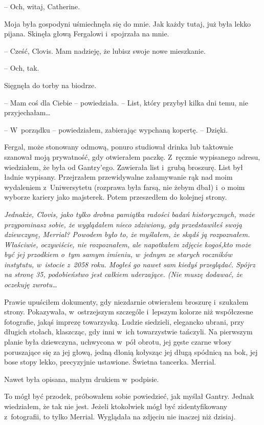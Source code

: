 \documentclass[oneside,polish,11pt,sfheadings]{mwbk}
\begin{document}
-- Och, witaj, Catherine.

Moja była gospodyni uśmiechnęła się do mnie. Jak każdy tutaj, już była
lekko pijana. Skinęła głową Fergalowi i~spojrzała na mnie.

-- Cześć, Clovis. Mam nadzieję, że lubisz swoje nowe mieszkanie.

-- Och, tak.

Sięgnęła do torby na biodrze. 

-- Mam coś dla Ciebie -- powiedziała. -- List, który przybył kilka dni temu, nie przyjechałam\ldots

-- W~porządku -- powiedziałem, zabierając wypchaną kopertę. -- Dzięki.

Fergal, może stonowany odmową, ponuro studiował drinka lub taktownie
szanował moją prywatność, gdy otwierałem paczkę. Z~ręcznie wypisanego
adresu, wiedziałem, że była od Gantry'ego. Zawierała list i~grubą
broszurę. List był ładnie wypisany. Przejrzałem przewidywalne
załamywanie rąk nad moim wydaleniem z~Uniwersytetu (rozprawa była farsą,
nie żebym dbał) i~o moim wyborze kariery jako majsterek. Potem
przeszedłem do kolejnej strony.

\textit{Jednakże, Clovis, jako tylko drobna pamiątka radości badań
historycznych, może przypominasz sobie, że wyglądałem nieco zdziwiony,
gdy przedstawiłeś swoją dziewczynę, Merrial? Powodem było to, że
myślałem, że skądś ją rozpoznałem. Właściwie, oczywiście, nie
rozpoznałem, ale napotkałem zdjęcie kogoś,kto może być jej przodkiem o~tym samym imieniu, w~jednym ze starych roczników instytutu, w~istocie z~2058 roku. Mogłeś go nawet sam kiedyś przeglądać. Spójrz na stronę 35,
podobieństwo jest całkiem uderzające. (Nie muszę dodawać, że oczekuję
zwrotu\ldots }

Prawie upuściłem dokumenty, gdy niezdarnie otwierałem broszurę i~szukałem strony. Pokazywała, w~ostrzejszym szczególe i~lepszym kolorze
niż współczesne fotografie, jakąś imprezę towarzyską. Ludzie siedzieli,
elegancko ubrani, przy długich stołach, klaszcząc, gdy inni w~ich
towarzystwie tańczyli. Na pierwszym planie była dziewczyna, uchwycona w~pół obrotu, jej gęste czarne włosy poruszające się za jej głową, jedną
dłonią kołysząc jej długą spódnicą na bok, jej bose stopy lekko,
precyzyjnie ustawione. Świetna tancerka. Merrial.

Nawet była opisana, małym drukiem w~podpisie.

To mógł być przodek, próbowałem sobie powiedzieć, jak myślał Gantry.
Jednak wiedziałem, że tak nie jest. Jeżeli ktokolwiek mógł być
zidentyfikowany z~fotografii, to tylko Merrial. Wyglądała na zdjęciu nie
inaczej niż dzisiaj.
\end{document}
